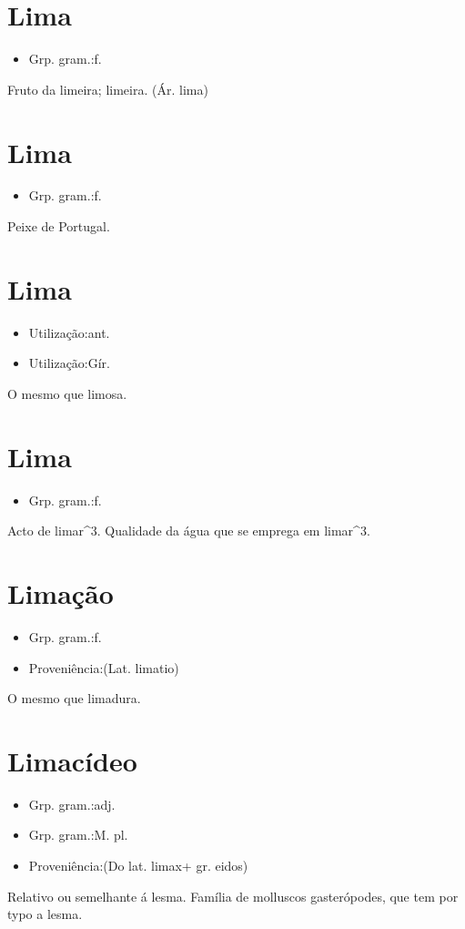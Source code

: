 \section{Lima}
\begin{itemize}
\item {Grp. gram.:f.}
\end{itemize}
Fruto da limeira; limeira.
(Ár. \textunderscore lima\textunderscore )
\section{Lima}
\begin{itemize}
\item {Grp. gram.:f.}
\end{itemize}
Peixe de Portugal.
\section{Lima}
\begin{itemize}
\item {Utilização:ant.}
\end{itemize}
\begin{itemize}
\item {Utilização:Gír.}
\end{itemize}
O mesmo que \textunderscore limosa\textunderscore .
\section{Lima}
\begin{itemize}
\item {Grp. gram.:f.}
\end{itemize}
Acto de \textunderscore limar\textunderscore ^3.
Qualidade da água que se emprega em limar^3.
\section{Limação}
\begin{itemize}
\item {Grp. gram.:f.}
\end{itemize}
\begin{itemize}
\item {Proveniência:(Lat. \textunderscore limatio\textunderscore )}
\end{itemize}
O mesmo que \textunderscore limadura\textunderscore .
\section{Limacídeo}
\begin{itemize}
\item {Grp. gram.:adj.}
\end{itemize}
\begin{itemize}
\item {Grp. gram.:M. pl.}
\end{itemize}
\begin{itemize}
\item {Proveniência:(Do lat. \textunderscore limax\textunderscore  + gr. \textunderscore eidos\textunderscore )}
\end{itemize}
Relativo ou semelhante á lesma.
Família de molluscos gasterópodes, que tem por typo a lesma.
